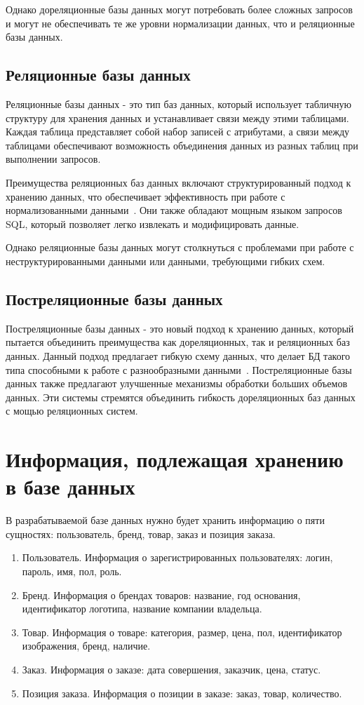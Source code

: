 \documentclass{bmstu}
\begin{document}
Однако дореляционные базы данных могут потребовать более сложных запросов и могут не обеспечивать те же уровни нормализации данных, что и реляционные базы данных.

\subsection{Реляционные базы данных}

Реляционные базы данных - это тип баз данных, который использует табличную структуру для хранения данных и устанавливает связи между этими таблицами. Каждая таблица представляет собой набор записей с атрибутами, а связи между таблицами обеспечивают возможность объединения данных из разных таблиц при выполнении запросов.

Преимущества реляционных баз данных включают структурированный подход к хранению данных, что обеспечивает эффективность при работе с нормализованными данными~\cite{SQL}. Они также обладают мощным языком запросов SQL, который позволяет легко извлекать и модифицировать данные.

Однако реляционные базы данных могут столкнуться с проблемами при работе с неструктурированными данными или данными, требующими гибких схем.

\subsection{Постреляционные базы данных}

Постреляционные базы данных - это новый подход к хранению данных, который пытается объединить преимущества как дореляционных, так и реляционных баз данных. Данный подход предлагает гибкую схему данных, что делает БД такого типа способными к работе с разнообразными данными~\cite{PostSQL}. Постреляционные базы данных также предлагают улучшенные механизмы обработки больших объемов данных. Эти системы стремятся объединить гибкость дореляционных баз данных с мощью реляционных систем.

\section{Информация, подлежащая хранению в базе данных}

В разрабатываемой базе данных нужно будет хранить информацию о пяти сущностях: пользователь, бренд, товар, заказ и позиция заказа.
\begin{enumerate}
\item Пользователь. 
Информация о зарегистрированных пользователях: логин, пароль, имя, пол, роль.
\item Бренд. 
Информация о брендах товаров: название, год основания, идентификатор логотипа, название компании владельца.
\item Товар. 
Информация о товаре: категория, размер, цена, пол, идентификатор изображения, бренд, наличие.
\item Заказ.
Информация о заказе: дата совершения, заказчик, цена, статус.
\item Позиция заказа.
Информация о позиции в заказе: заказ, товар, количество.
\end{enumerate}
\end{document}
